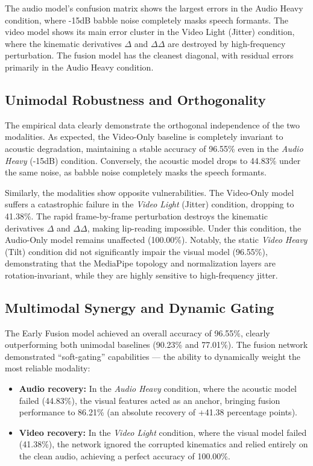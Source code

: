 \documentclass[sigconf,screen,nonacm]{acmart}
\begin{document}
The audio model's confusion matrix shows the largest errors in the Audio Heavy condition, where -15dB babble noise completely masks speech formants. The video model shows its main error cluster in the Video Light (Jitter) condition, where the kinematic derivatives $\Delta$ and $\Delta\Delta$ are destroyed by high-frequency perturbation. The fusion model has the cleanest diagonal, with residual errors primarily in the Audio Heavy condition.

\subsection{Unimodal Robustness and Orthogonality}

The empirical data clearly demonstrate the orthogonal independence of the two modalities. As expected, the Video-Only baseline is completely invariant to acoustic degradation, maintaining a stable accuracy of 96.55\% even in the \textit{Audio Heavy} (-15dB) condition. Conversely, the acoustic model drops to 44.83\% under the same noise, as babble noise completely masks the speech formants.

Similarly, the modalities show opposite vulnerabilities. The Video-Only model suffers a catastrophic failure in the \textit{Video Light} (Jitter) condition, dropping to 41.38\%. The rapid frame-by-frame perturbation destroys the kinematic derivatives $\Delta$ and $\Delta\Delta$, making lip-reading impossible. Under this condition, the Audio-Only model remains unaffected (100.00\%). Notably, the static \textit{Video Heavy} (Tilt) condition did not significantly impair the visual model (96.55\%), demonstrating that the MediaPipe topology and normalization layers are rotation-invariant, while they are highly sensitive to high-frequency jitter.

\subsection{Multimodal Synergy and Dynamic Gating}

The Early Fusion model achieved an overall accuracy of 96.55\%, clearly outperforming both unimodal baselines (90.23\% and 77.01\%). The fusion network demonstrated ``soft-gating'' capabilities --- the ability to dynamically weight the most reliable modality:
\begin{itemize}
  \item \textbf{Audio recovery:} In the \textit{Audio Heavy} condition, where the acoustic model failed (44.83\%), the visual features acted as an anchor, bringing fusion performance to 86.21\% (an absolute recovery of +41.38 percentage points).
  \item \textbf{Video recovery:} In the \textit{Video Light} condition, where the visual model failed (41.38\%), the network ignored the corrupted kinematics and relied entirely on the clean audio, achieving a perfect accuracy of 100.00\%.
\end{itemize}
\end{document}
